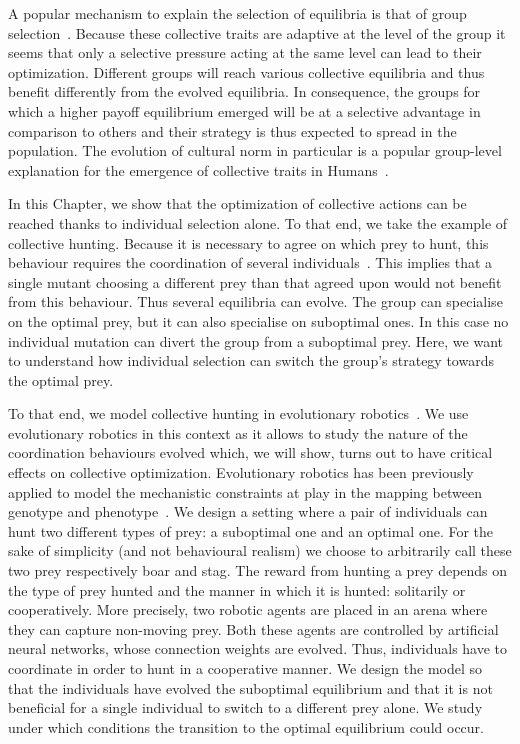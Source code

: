   A popular mechanism to explain the selection of equilibria is that of group selection~\parencite{Boyd1990}. Because these collective traits are adaptive at the level of the group it seems that only a selective pressure acting at the same level can lead to their optimization. Different groups will reach various collective equilibria and thus benefit differently from the evolved equilibria. In consequence, the groups for which a higher payoff equilibrium emerged will be at a selective advantage in comparison to others and their strategy is thus expected to spread in the population. The evolution of cultural norm in particular is a popular group-level explanation for the emergence of collective traits in Humans~\parencite{Boyd2002, Binmore2011, Smaldino2014}.

  In this Chapter, we show that the optimization of collective actions can be reached thanks to individual selection alone. To that end, we take the example of collective hunting. Because it is necessary to agree on which prey to hunt, this behaviour requires the coordination of several individuals~\parencite{Alvard2002, Alvard2003, Drea2009a}. This implies that a single mutant choosing a different prey than that agreed upon would not benefit from this behaviour. Thus several equilibria can evolve. The group can specialise on the optimal prey, but it can also specialise on suboptimal ones. In this case no individual mutation can divert the group from a suboptimal prey. Here, we want to understand how individual selection can switch the group's strategy towards the optimal prey.

  To that end, we model collective hunting in evolutionary robotics~\parencite{Nolfi2000, Doncieux2015a}. We use evolutionary robotics in this context as it allows to study the nature of the coordination behaviours evolved which, we will show, turns out to have critical effects on collective optimization. Evolutionary robotics has been previously applied to model the mechanistic constraints at play in the mapping between genotype and phenotype~\parencite{Mitri2013, Trianni2014b, Bernard2016a}. We design a setting where a pair of individuals can hunt two different types of prey: a suboptimal one and an optimal one. For the sake of simplicity (and not behavioural realism) we choose to arbitrarily call these two prey respectively boar and stag. The reward from hunting a prey depends on the type of prey hunted and the manner in which it is hunted: solitarily or cooperatively. More precisely, two robotic agents are placed in an arena where they can capture non-moving prey. Both these agents are controlled by artificial neural networks, whose connection weights are evolved. Thus, individuals have to coordinate in order to hunt in a cooperative manner. We design the model so that the individuals have evolved the suboptimal equilibrium and that it is not beneficial for a single individual to switch to a different prey alone. We study under which conditions the transition to the optimal equilibrium could occur.


